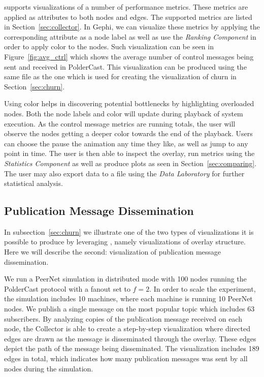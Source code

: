 \demo{} supports visualizations of a number of performance metrics.
These metrics are applied as attributes to both nodes and edges. The
supported metrics are listed in Section~\ref{sec:collector}. In Gephi,
we can visualize these metrics by applying the corresponding attribute
as a node label as well as use the \emph{Ranking Component} in order to
apply color to the nodes. Such visualization can be seen in
Figure~\ref{fig:avg_ctrl} which shows the average number of control
messages being sent and received in PolderCast. This visualization can
be produced using the same \gexf{} file as the one which is used for
creating the visualization of churn in Section~\ref{sec:churn}.

Using color helps in discovering potential bottlenecks by highlighting
overloaded nodes. Both the node labels and color will update during
playback of system execution. As the control message metrics are running
totals, the user will observe the nodes getting a deeper color towards
the end of the playback. Users can choose the pause the animation any
time they like, as well as jump to any point in time. The user is then
able to inspect the overlay, run metrics using the \emph{Statistics
    Component} as well as produce plots as seen in
Section~\ref{sec:comparing}. The user may also export data to a \csv
file using the \emph{Data Laboratory} for further statistical analysis.

\subsection{Publication Message Dissemination}
\label{sec:dissviz}

In subsection~\ref{sec:churn} we illustrate one of the two types of
visualizations it is possible to produce by leveraging \demo, namely
visualizations of overlay structure. Here we will describe the second:
visualization of publication message dissemination.

We run a PeerNet simulation in distributed mode with 100 nodes running
the PolderCast protocol with a fanout set to $f=2$. In order to scale
the experiment, the simulation includes 10 machines, where each machine
is running 10 PeerNet nodes. We publish a single message on the
most popular topic which includes 63 subscribers. By analyzing copies of
the publication message received on each node, the Collector is able to
create a step-by-step visualization where directed edges are drawn as
the message is disseminated through the overlay. These edges depict the
path of the message being disseminated. The visualization includes 189
edges in total, which indicates how many publication messages was sent
by all nodes during the simulation.


